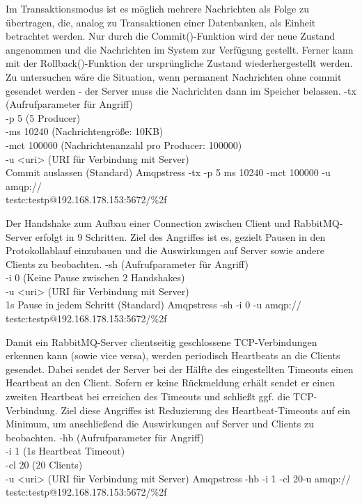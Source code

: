 \documentclass[	a4paper,
			11pt,
			oneside,
			parskip]{scrartcl}
\begin{document}
		{%
		 Im Transaktionsmodus ist es möglich mehrere Nachrichten als Folge zu übertragen, die, analog zu Transaktionen einer Datenbanken, als Einheit betrachtet werden. Nur durch die Commit()-Funktion
		 wird der neue Zustand angenommen und die Nachrichten im System zur Verfügung gestellt. Ferner kann mit der Rollback()-Funktion der ursprüngliche Zustand wiederhergestellt werden.
		 Zu untersuchen wäre die Situation, wenn permanent Nachrichten ohne commit gesendet werden - der Server muss die Nachrichten dann im Speicher belassen.
		}{%
		 -tx (Aufrufparameter für Angriff) \\
		 -p 5 (5 Producer) \\
		 -ms 10240 (Nachrichtengröße: 10KB) \\
		 -mct 100000 (Nachrichtenanzahl pro Producer: 100000) \\
		 -u <uri> (URI für Verbindung mit Server) \\
		 Commit auslassen (Standard)
		}{%
		 Amqpstress -tx -p 5 ms 10240 -mct 100000 -u amqp://\\\hspace*{3cm}testc:testp@192.168.178.153:5672/\%2f
		}
	
	
		{%
		 Der Handshake zum Aufbau einer Connection zwischen Client und RabbitMQ-Server erfolgt in 9 Schritten. Ziel des Angriffes ist es, gezielt Pausen in den Protokollablauf einzubauen und die
		 Auswirkungen auf Server sowie andere Clients zu beobachten.
		}{%
		 -sh (Aufrufparameter für Angriff) \\
		 -i 0 (Keine Pause zwischen 2 Handshakes) \\
		 -u <uri> (URI für Verbindung mit Server) \\
		 1s Pause in jedem Schritt (Standard) 
		}{%
		 Amqpstress -sh -i 0 -u amqp://\\\hspace*{3cm}testc:testp@192.168.178.153:5672/\%2f
		}


		{%
		 Damit ein RabbitMQ-Server clientseitig geschlossene TCP-Verbindungen erkennen kann (sowie vice versa), werden periodisch Heartbeats an die Clients gesendet. Dabei sendet der Server bei der Hälfte des
		 eingestellten Timeouts einen Heartbeat an den Client. Sofern er keine Rückmeldung erhält sendet er einen zweiten Heartbeat bei erreichen des Timeouts und schließt ggf. die TCP-Verbindung. Ziel diese Angriffes ist Reduzierung des Heartbeat-Timeouts auf ein Minimum, um anschließend die Auswirkungen auf Server und Clients zu beobachten. 
		}{%
		 -hb (Aufrufparameter für Angriff) \\
		 -i 1 (1s Heartbeat Timeout) \\
		 -cl 20 (20 Clients) \\
		 -u <uri> (URI für Verbindung mit Server)
		}{%
		 Amqpstress -hb -i 1 -cl 20-u amqp://\\\hspace*{3cm} testc:testp@192.168.178.153:5672/\%2f
		}
\end{document}
